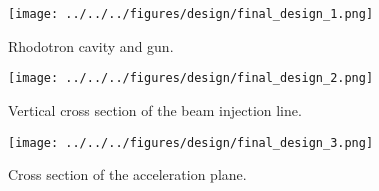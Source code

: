 \documentclass{book}
\begin{document}
\begin{figure}
    \centering
    \texttt{[image: ../../../figures/design/final\_design\_1.png]}
    \vspace{20pt}
    \caption{Rhodotron cavity and \e gun.}
    \label{fig:fin_rend_cav_egun}
\end{figure}

\begin{figure}
    \centering
    \texttt{[image: ../../../figures/design/final\_design\_2.png]}
    \vspace{20pt}
    \caption{Vertical cross section of the beam injection line.}
    \label{fig:fin_rend_cs_bil}
\end{figure}

\begin{figure}
    \centering
    \texttt{[image: ../../../figures/design/final\_design\_3.png]}
    \vspace{20pt}
    \caption{Cross section of the acceleration plane.}
    \label{fig:fin_rend_cs_ap}
\end{figure}

\end{document}
